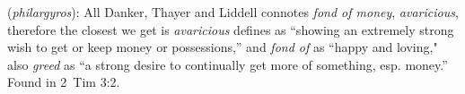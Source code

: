 \item[Moneyphile,]

(\textit{philargyros}):
All Danker, Thayer and Liddell connotes \emph{fond of money}, \emph{avaricious}, therefore the closest we get is \emph{avaricious} defines as ``showing an extremely strong wish to get or keep money or possessions,'' and \emph{fond of} as ``happy and loving," also \emph{greed} as ``a strong desire to continually get more of something, esp. money.''
Found in 2~Tim 3:2.
